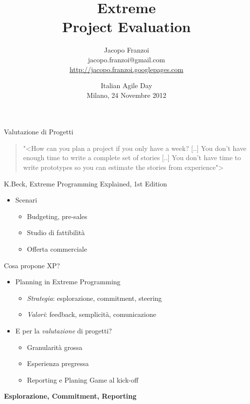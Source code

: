 \documentclass[compress, red, 14pt]{beamer}
\title{ Extreme \\ Project Evaluation }
\author{
	Jacopo Franzoi \\
	{\scriptsize jacopo.franzoi@gmail.com } \\
	{\scriptsize \href{http://jacopo.franzoi.googlepages.com/}{http://jacopo.franzoi.googlepages.com} \\ }
}
\date{
	Italian Agile Day \\
	Milano, 24 Novembre 2012
}
\newcommand{\highlight}[1]{{\color{purple} \emph{#1}}}
\begin{document}
	\begin{frame}
		\titlepage
	\end{frame}

	\begin{frame}{Valutazione di Progetti}
		\begin{quote}
			{\small "<{How can you plan a project if you only have a week? [..] You don't have enough time to write a complete set of stories [..] You don't have time to write prototypes so you can estimate the stories from experience}">}
		\end{quote}
		\hfill {\scriptsize K.Beck, Extreme Programming Explained, 1st Edition}

		\begin{itemize}
			\item Scenari
			\begin{itemize}
				\item Budgeting, pre-sales
				\item Studio di fattibilità
				\item Offerta commerciale
			\end{itemize}
		\end{itemize}
	\end{frame}


	\begin{frame}{Cosa propone XP?}
		\begin{itemize}
			\item Planning in Extreme Programming
			\begin{itemize}
				\item \highlight{Strategia}: esplorazione, commitment, steering
				\item \highlight{Valori}: feedback, semplicità, comunicazione
			\end{itemize}
		\end{itemize}

		\begin{itemize}
			\item E per la \highlight{valutazione} di progetti?
			\begin{itemize}
				\item Granularità grossa
				\item Esperienza pregressa
				\item Reporting e Planing Game al kick-off
			\end{itemize}
		\end{itemize}
		
		\begin{center}
			\textbf{Esplorazione, Commitment, Reporting}
		\end{center}
	\end{frame}
\end{document}

